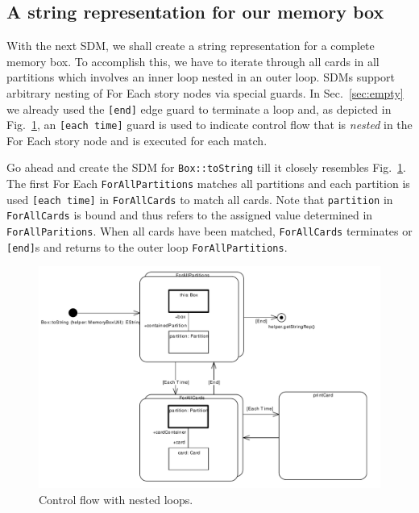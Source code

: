 \subsection{A string representation for our memory box}

With the next SDM, we shall create a string representation for a complete memory
box.  To accomplish this, we have to iterate through all cards in all partitions
which involves an inner loop nested in an outer loop.  SDMs support arbitrary nesting
of For Each story nodes via special guards.  In Sec.~\ref{sec:empty} we already
used the \texttt{[end]} edge guard to terminate a loop and, as depicted in
Fig.~\ref{fig:sdm_tostring_1}, an \texttt{[each time]} guard is used to indicate
control flow that is \emph{nested} in the For Each story node and is executed
for each match.

Go ahead and create the SDM for \texttt{Box::toString} till it closely resembles
Fig.~\ref{fig:sdm_tostring_1}.  The first For Each \texttt{ForAllPartitions}
matches all partitions and each partition is used \texttt{[each time]} in
\texttt{ForAllCards} to match all cards.  Note that \texttt{partition} in
\texttt{ForAllCards} is bound  and thus refers to the assigned value determined
in \texttt{ForAllParitions}.  When all cards have been matched,
\texttt{ForAllCards} terminates or \texttt{[end]}s and returns to the outer loop
\texttt{ForAllPartitions}.

\begin{figure}[htbp]
\begin{center}
  \includegraphics[width=\textwidth]{pics/sdmBilder/toString/sdm72.pdf}
  \caption{Control flow with nested loops.}  
  \label{fig:sdm_tostring_1}
\end{center}
\end{figure}

